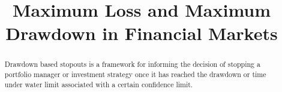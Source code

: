 \documentclass[12pt,letterpaper,english]{article}
\begin{document}


\title{ Maximum Loss and Maximum Drawdown in Financial
Markets}


\makeatletter
\makeatother
\maketitle

\begin{abstract}

Drawdown based stopouts is a framework for informing the decision of stopping a portfolio manager or investment strategy once it has reached the drawdown or time under water limit associated with a certain confidence limit. 

\end{abstract}
\end{document}
